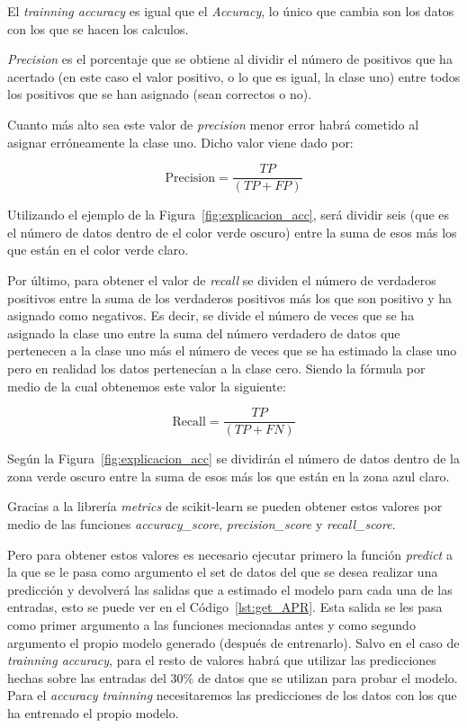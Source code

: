 \documentclass[a4paper, 12pt]{book}
\begin{document}
El \textit{trainning accuracy} es igual que el \textit{Accuracy}, lo único que cambia son los datos con los que se hacen los calculos.

\textit{Precision} es el porcentaje que se obtiene al dividir el número de positivos que ha acertado (en este caso el valor positivo, o lo que es igual, la clase uno) entre todos los positivos que se han asignado (sean correctos o no). 

Cuanto más alto sea este valor de \textit{precision} menor error habrá cometido al asignar erróneamente la clase uno. Dicho valor viene dado por:

\begin{equation}
\label{eqn:accuracy} 
 \boxed{\mbox{Precision} = \frac{TP}{(TP + FP)}}
\end{equation}

Utilizando el ejemplo de la Figura~\ref{fig:explicacion_acc}, será dividir seis (que es el número de datos dentro de el color verde oscuro) entre la suma de esos más los que están en el color verde claro.

Por último, para obtener el valor de \textit{recall} se dividen el número de verdaderos positivos entre la suma de los verdaderos positivos más los que son positivo y ha asignado como negativos. Es decir, se divide el número de veces que se ha asignado la clase uno entre la suma del número verdadero de datos que pertenecen a la clase uno más el número de veces que se ha estimado la clase uno pero en realidad los datos pertenecían a la clase cero. Siendo la fórmula por medio de la cual obtenemos este valor la siguiente:

\begin{equation}
 \boxed{\mbox{Recall} = \frac{TP}{(TP + FN)}}
\end{equation}

Según la Figura~\ref{fig:explicacion_acc} se dividirán el número de datos dentro de la zona verde oscuro entre la suma de esos más los que están en la zona azul claro.

Gracias a la librería \textit{metrics} de scikit-learn se pueden obtener estos valores por medio de las funciones \textit{accuracy\_score}, \textit{precision\_score} y \textit{recall\_score}. 

Pero para obtener estos valores es necesario ejecutar primero la función \textit{predict} a la que se le pasa como argumento el set de datos del que se desea realizar una predicción y devolverá las salidas que a estimado el modelo para cada una de las entradas, esto se puede ver en el Código~\ref{lst:get_APR}. Esta salida se les pasa como primer argumento a las funciones mecionadas antes  y como segundo argumento el propio modelo generado (después de entrenarlo). Salvo en el caso de \textit{trainning accuracy}, para el resto de valores habrá que utilizar las predicciones hechas sobre las entradas del 30\% de datos que se utilizan para probar el modelo. Para el \textit{accuracy trainning} necesitaremos las predicciones de los datos con los que ha entrenado el propio modelo.
\end{document}
